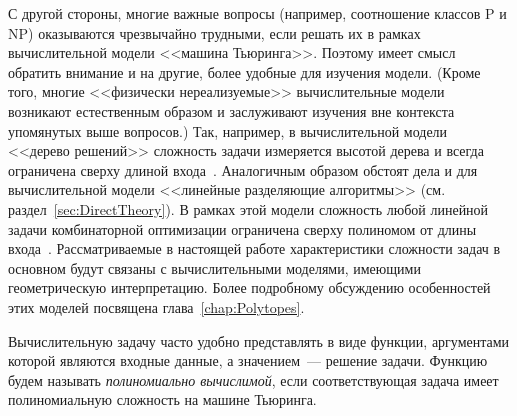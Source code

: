 С другой стороны, многие важные вопросы (например, соотношение классов P и NP) оказываются чрезвычайно трудными, если решать их в рамках вычислительной модели <<машина Тьюринга>>.
Поэтому имеет смысл обратить внимание и на другие, более удобные для изучения модели. (Кроме того, многие <<физически нереализуемые>> вычислительные модели возникают естественным образом и заслуживают изучения вне контекста упомянутых выше вопросов.) Так, например, в вычислительной модели <<дерево решений>> сложность задачи измеряется высотой дерева и всегда ограничена сверху длиной входа~\cite[c.~260]{Arora:2009}. Аналогичным образом обстоят дела и для вычислительной модели <<линейные разделяющие алгоритмы>> (см. раздел~\ref{sec:DirectTheory}). В рамках этой модели сложность любой линейной задачи комбинаторной оптимизации ограничена сверху полиномом от длины входа~\cite{Moshkov:1982}. Рассматриваемые в настоящей работе характеристики сложности задач в основном будут связаны с вычислительными моделями, имеющими геометрическую интерпретацию. Более подробному обсуждению особенностей этих моделей посвящена глава~\ref{chap:Polytopes}.

\begin{comment}
С другой стороны, все используемые в настоящее время вычислительные устройства эквивалентны в смысле тезиса Кобхэма--Эдмондса~\cite[c.~33]{Goldreich:2008},
который часто называют тезисом Чёрча--Тьюринга в сильной форме~\cite[c.~26]{Arora:2009}.

\textbf{Тезис Кобхэма--Эдмондса.}
\emph{Любая физически реализуемая вычислительная модель 
может быть просимулирована (одноленточной) машиной Тьюринга
с (не более чем) полиномиальным увеличением времени работы.}

В частности, этот тезис утверждает, что принадлежность задачи к классу $P$ (полиномиально разрешимых задач) не зависит от выбора физически реализуемой вычислительной модели.

Справедливости ради заметим, что, теоретически, с помощью квантовых вычислений можно решать задачи, принадлежность которых к классу $P$ в настоящее время не доказана.
Тем не менее, возможность физической реализации квантовых компьютеров (точнее, возможность их масштабирования) пока остается под вопросом (перспективы этого направления хорошо описаны в~\cite{Aaronson:2008}).
\end{comment}

Вычислительную задачу часто удобно представлять в виде функции, аргументами которой являются входные данные, а значением~--- решение задачи.
Функцию будем называть \emph{полиномиально вычислимой}, если соответствующая задача имеет полиномиальную сложность на машине Тьюринга.

